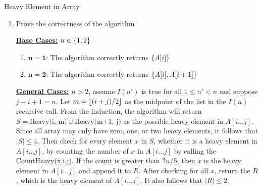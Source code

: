 \documentclass{article}
\begin{document}
\begin{section}{Heavy Element in Array}
\begin{enumerate}
        (ii) Begin with the fact that the heavy element in $A$ must be the heavy element in either left-half subarray, right-half subarray, or both.
        
        The base case of the algorithm is when $n \in \cbracket{1, 2}$, where all of the element is heavy element.
        
        The general case is when $n > 2$, where we will apply the recursion. First, we identify the midpoint $m = \floor{(i+j)/2}$ of the array $A[i \dots j]$. Then using the fact we know before, the candidate of the heavy element in $A$ is the union of heavy element in left-half and right-half subarray, and store it as the set $S$. Then, check for every element of $S$, whether the count of that particular element in the array $A[i \dots j]$ exceed 40\% by calling CountHeavy(x, i, j). If so, store the element into $R$.
        After checking for all the element in $S$, the algorithm return $R$, which is the set containing the heavy element in $A[i \dots j$
        
        The second algorithm, CountHeavy(x, i, j) simply count the number of $x$ in the array $A[i \dots j]$
        
        \item Prove the correctness of the algorithm
        
        {\bf \underline{Base Cases:}} $n \in \cbracket{1,2}$
        \begin{enumerate}
            \item $\mathbf{n = 1}$: The algorithm correctly returns $\left\{A[i]\right\}$
            \item $\mathbf{n = 2}$: The algorithm correctly returns $\left\{A[i], A[i+1]\right\}$
        \end{enumerate}
        {\bf \underline{General Cases:}} $n > 2$, assume $I(n')$ is true for all $1 \leq n' < n$ and suppose $j - i + 1 = n$. Let $m = \floor{(i + j)/2}$ as the midpoint of the list in the $I(n)$ recursive call. From the induction, the algorithm will return $S = \text{Heavy(i, m)} \cup \text{Heavy(m+1, j)}$ as the possible heavy element in $A[i \dots j]$. Since all array may only have zero, one, or two heavy elements, it follows that $|S| \leq 4$. Then check for every element $x$ in $S$, whether it is a heavy element in $A[i \dots j]$, by counting the number of $x$ in $A[i \dots j]$ by calling the CountHeavy(x,i,j). If the count is greater than $2n/5$, then $x$ is the heavy element in $A[i \dots j]$ and append it to $R$. After checking for all $x$, return the $R$, which is the heavy element of $A[i \dots j]$. It also follows that $|R| \leq 2$.
        

\end{enumerate}
\end{section}
\end{document}
